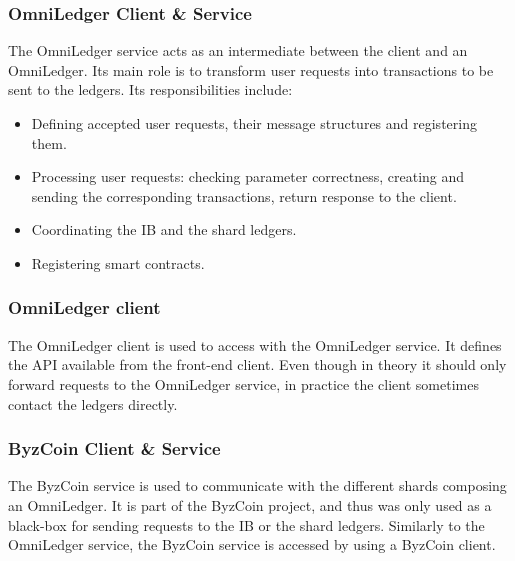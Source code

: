 \subsubsection{OmniLedger Client \& Service}
The OmniLedger service acts as an intermediate between the client and an OmniLedger. Its main role is to transform user requests into transactions to be sent to the ledgers. Its responsibilities include: 
\begin{itemize}
	\item Defining accepted user requests, their message structures and registering them.
	\item Processing user requests: checking parameter correctness, creating and sending the corresponding transactions, return response to the client.
	\item Coordinating the IB and the shard ledgers.
	\item Registering smart contracts.
\end{itemize}

\subsubsection{OmniLedger client}
The OmniLedger client is used to access with the OmniLedger service. It defines the API available from the front-end client. Even though in theory it should only forward requests to the OmniLedger service, in practice the client sometimes contact the ledgers directly.

\subsubsection{ByzCoin Client \& Service}
The ByzCoin service is used to communicate with the different shards composing an OmniLedger. It is part of the ByzCoin project, and thus was only used as a black-box for sending requests to the IB or the shard ledgers. Similarly to the OmniLedger service, the ByzCoin service is accessed by using a ByzCoin client.

